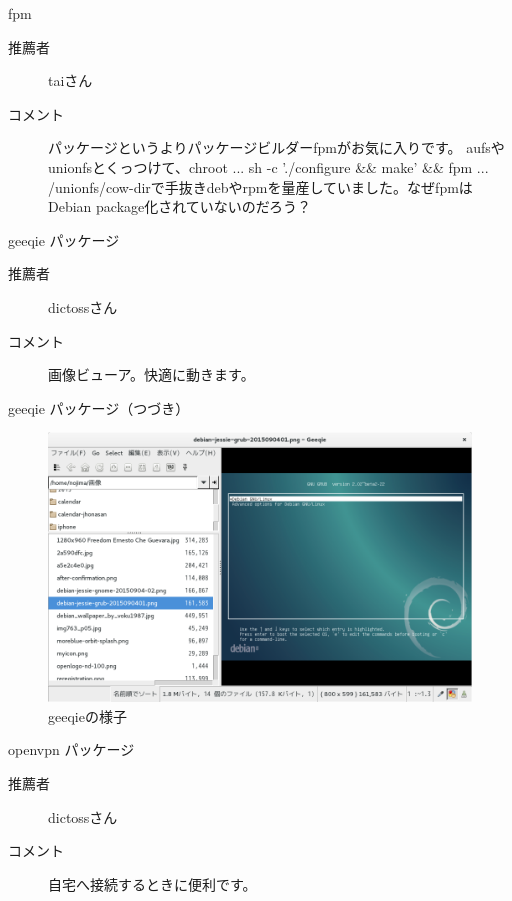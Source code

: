 \begin{frame}{fpm}
  \begin{description}
    \item [推薦者] taiさん
  　\item [コメント] パッケージというよりパッケージビルダーfpmがお気に入りです。
aufsやunionfsとくっつけて、chroot ... sh -c './configure \&\& make' \&\& fpm ... /unionfs/cow-dirで手抜きdebやrpmを量産していました。なぜfpmはDebian package化されていないのだろう？
  \end{description}

\end{frame}

\begin{frame}{geeqie パッケージ}

  \begin{description}
    \item [推薦者] dictossさん
  　\item [コメント] 画像ビューア。快適に動きます。
  \end{description}

\end{frame}

\begin{frame}{geeqie パッケージ（つづき）}

\begin{figure}[htbp]
\includegraphics[width=0.8\hsize]{image201512/geeqie.png}
\caption{geeqieの様子}
\end{figure}

\end{frame}

\begin{frame}{openvpn パッケージ}

  \begin{description}
    \item [推薦者] dictossさん
  　\item [コメント] 自宅へ接続するときに便利です。
  \end{description}

\end{frame}

